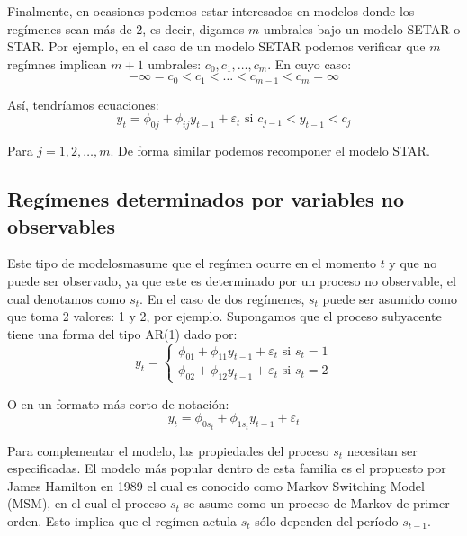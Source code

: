 \documentclass[
]{book}
\begin{document}
Finalmente, en ocasiones podemos estar interesados en modelos donde los regímenes sean más de 2, es decir, digamos \(m\) umbrales bajo un modelo SETAR o STAR. Por ejemplo, en el caso de un modelo SETAR podemos verificar que \(m\) regímnes implican \(m + 1\) umbrales: \(c_0, c_1, \ldots, c_m\). En cuyo caso:
\begin{equation*}
    -\infty = c_0 < c_1 < \ldots < c_{m-1} < c_m = \infty
\end{equation*}

Así, tendríamos ecuaciones:
\begin{equation}
    y_t = \phi_{0j} + \phi_{ij} y_{t-1} + \varepsilon_t \text{ si } c_{j-1} < y_{t-1} < c_j
\end{equation}

Para \(j = 1, 2, \ldots, m\). De forma similar podemos recomponer el modelo STAR.

\hypertarget{reguxedmenes-determinados-por-variables-no-observables}{%
\subsection{Regímenes determinados por variables no observables}\label{reguxedmenes-determinados-por-variables-no-observables}}

Este tipo de modelosmasume que el regímen ocurre en el momento \(t\) y que no puede ser observado, ya que este es determinado por un proceso no observable, el cual denotamos como \(s_t\). En el caso de dos regímenes, \(s_t\) puede ser asumido como que toma 2 valores: 1 y 2, por ejemplo. Supongamos que el proceso subyacente tiene una forma del tipo AR(1) dado por:
\begin{equation}
    y_t = 
    \begin{cases}
        \phi_{01} + \phi_{11} y_{t-1} + \varepsilon_t \text{ si } s_t = 1 \\
        \phi_{02} + \phi_{12} y_{t-1} + \varepsilon_t \text{ si } s_t = 2
    \end{cases}
    \label{eq_swching_obs}
\end{equation}

O en un formato más corto de notación:
\begin{equation}
    y_t = \phi_{0 s_t} + \phi_{1 s_t} y_{t-1} + \varepsilon_t
\end{equation}

Para complementar el modelo, las propiedades del proceso \(s_t\) necesitan ser especificadas. El modelo más popular dentro de esta familia es el propuesto por James Hamilton en 1989 el cual es conocido como Markov Switching Model (MSM), en el cual el proceso \(s_t\) se asume como un proceso de Markov de primer orden. Esto implica que el regímen actula \(s_t\) sólo dependen del período \(s_{t-1}\).
\end{document}
